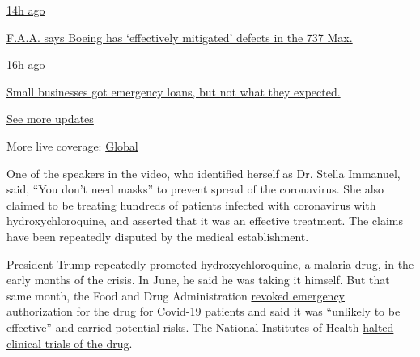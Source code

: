 \href{https://www.nytimes3xbfgragh.onion/live/2020/08/03/business/stock-market-today-coronavirus?action=click\&pgtype=Article\&state=default\&region=MAIN_CONTENT_1\&context=storylines_live_updates\#faa-says-boeing-has-effectively-mitigated-defects-in-the-737-max}{14h
ago}

\href{https://www.nytimes3xbfgragh.onion/live/2020/08/03/business/stock-market-today-coronavirus?action=click\&pgtype=Article\&state=default\&region=MAIN_CONTENT_1\&context=storylines_live_updates\#faa-says-boeing-has-effectively-mitigated-defects-in-the-737-max}{F.A.A.
says Boeing has `effectively mitigated' defects in the 737 Max.}

\href{https://www.nytimes3xbfgragh.onion/live/2020/08/03/business/stock-market-today-coronavirus?action=click\&pgtype=Article\&state=default\&region=MAIN_CONTENT_1\&context=storylines_live_updates\#small-businesses-got-emergency-loans-but-not-what-they-expected}{16h
ago}

\href{https://www.nytimes3xbfgragh.onion/live/2020/08/03/business/stock-market-today-coronavirus?action=click\&pgtype=Article\&state=default\&region=MAIN_CONTENT_1\&context=storylines_live_updates\#small-businesses-got-emergency-loans-but-not-what-they-expected}{Small
businesses got emergency loans, but not what they expected.}

\href{https://www.nytimes3xbfgragh.onion/live/2020/08/03/business/stock-market-today-coronavirus?action=click\&pgtype=Article\&state=default\&region=MAIN_CONTENT_1\&context=storylines_live_updates}{See
more updates}

More live coverage:
\href{https://www.nytimes3xbfgragh.onion/2020/08/04/world/coronavirus-covid-19.html?action=click\&pgtype=Article\&state=default\&region=MAIN_CONTENT_1\&context=storylines_live_updates}{Global}

One of the speakers in the video, who identified herself as Dr. Stella
Immanuel, said, ``You don't need masks'' to prevent spread of the
coronavirus. She also claimed to be treating hundreds of patients
infected with coronavirus with hydroxychloroquine, and asserted that it
was an effective treatment. The claims have been repeatedly disputed by
the medical establishment.

President Trump repeatedly promoted hydroxychloroquine, a malaria drug,
in the early months of the crisis. In June, he said he was taking it
himself. But that same month, the Food and Drug Administration
\href{https://www.fda.gov/media/138945/download}{revoked emergency
authorization} for the drug for Covid-19 patients and said it was
``unlikely to be effective'' and carried potential risks. The National
Institutes of Health
\href{https://www.nytimes3xbfgragh.onion/2020/06/20/health/hydroxychloroquine-coronavirus-trial.html}{halted
clinical trials of the drug}.


